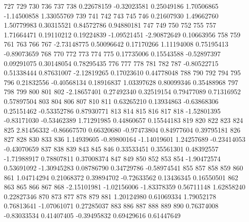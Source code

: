 \documentclass{article}
\begin{document}
\begin{Schunk}
\begin{Soutput}
        727         729         730         736         737         738 
 0.22678159 -0.32023581  0.25049186  1.70506865 -1.14500858  1.33055769 
        739         741         742         743         745         746 
 0.21607930  1.49662760  1.50779983  0.30315521  0.84572786  0.94880181 
        747         749         750         752         755         757 
 1.71664471  0.19110212  0.19224839 -1.09521451 -2.90872649  0.10663956 
        758         759         761         763         766         767 
-2.73148775  0.50096642  0.17170266  1.11194008  0.75195413 -0.89073659 
        768         770         772         773         774         775 
 0.17735006  0.15543588 -0.52897397  0.09291075  0.30148054  0.78295435 
        776         777         778         781         782         787 
-0.80522715  0.51338444  0.87631007 -2.12819265  0.17023610  0.44778048 
        788         790         792         794         795         796 
 0.21832556 -0.40568134  0.18916837  1.03397628  0.80099346  0.35488968 
        797         798         799         800         801         802 
-2.18657401  0.27492340  0.32519154  0.79477089  0.71316952  0.57897504 
        803         804         806         807         810         811 
 0.63265210  0.13934863 -0.63868306  0.25151462 -0.53352786  0.87930771 
        813         814         815         816         817         818 
-1.52801395 -0.83171030 -0.53462389  1.71291985  0.44860657  0.15544183 
        819         820         822         823         824         825 
 2.81456332 -0.86667570  0.66320680 -0.97473804  0.84977604  0.39795181 
        826         827         828         830         833         836 
 1.14939605 -0.89800164 -1.14019601  1.24257689 -0.23414053 -0.43070659 
        837         838         839         843         845         846 
 0.33533451  0.35561301  0.48392557 -1.71988917  0.78807811  0.37008374 
        847         849         850         852         853         854 
-1.90472574  0.53691092 -1.30945283  0.08786790  0.34729786 -0.58974541 
        855         857         858         859         860         861 
 1.04714294  0.21068372  0.39894702 -0.72633562  0.13436345  0.16550501 
        862         863         865         866         867         868 
-2.15101981 -1.02156006 -1.83378359  0.56711148  1.62858240  0.22827346 
        870         873         877         878         879         881 
 1.20124980  0.61069334  1.79052178  0.76813641 -1.07061071  0.27285037 
        883         886         887         888         889         890 
 0.76374008 -0.83033534  0.41407405 -0.39495832  0.69429616  0.61447649 

\end{Soutput}
\end{Schunk}
\end{document}
